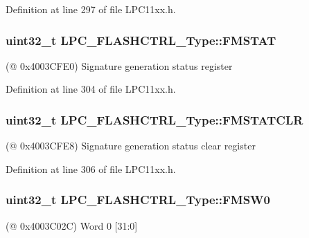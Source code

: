 Definition at line 297 of file L\+P\+C11xx.\+h.

\subsubsection[{\texorpdfstring{F\+M\+S\+T\+AT}{FMSTAT}}]{ uint32\+\_\+t L\+P\+C\+\_\+\+F\+L\+A\+S\+H\+C\+T\+R\+L\+\_\+\+Type\+::\+F\+M\+S\+T\+AT}\hypertarget{group___l_p_c11xx___definitions_gac196f302787ff85c055a02a32fae86d6}{}\label{group___l_p_c11xx___definitions_gac196f302787ff85c055a02a32fae86d6}
(@ 0x4003\+C\+F\+E0) Signature generation status register 

Definition at line 304 of file L\+P\+C11xx.\+h.

\subsubsection[{\texorpdfstring{F\+M\+S\+T\+A\+T\+C\+LR}{FMSTATCLR}}]{ uint32\+\_\+t L\+P\+C\+\_\+\+F\+L\+A\+S\+H\+C\+T\+R\+L\+\_\+\+Type\+::\+F\+M\+S\+T\+A\+T\+C\+LR}\hypertarget{group___l_p_c11xx___definitions_gaf55332ea67635bc3c2cad7d51a9478f6}{}\label{group___l_p_c11xx___definitions_gaf55332ea67635bc3c2cad7d51a9478f6}
(@ 0x4003\+C\+F\+E8) Signature generation status clear register 

Definition at line 306 of file L\+P\+C11xx.\+h.

\subsubsection[{\texorpdfstring{F\+M\+S\+W0}{FMSW0}}]{ uint32\+\_\+t L\+P\+C\+\_\+\+F\+L\+A\+S\+H\+C\+T\+R\+L\+\_\+\+Type\+::\+F\+M\+S\+W0}\hypertarget{group___l_p_c11xx___definitions_ga402795c81bfe0d9a3560dd9cfe784ec3}{}\label{group___l_p_c11xx___definitions_ga402795c81bfe0d9a3560dd9cfe784ec3}
(@ 0x4003\+C02C) Word 0 \mbox{[}31\+:0\mbox{]} 


